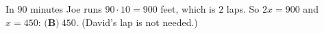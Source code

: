 In $90$ minutes Joe runs $90\cdot10=900$ feet, which is $2$ laps. So $2x=900$ and $x=450$: $\boxed{\textbf{(B)}\ 450}$. (David's lap is not needed.)
